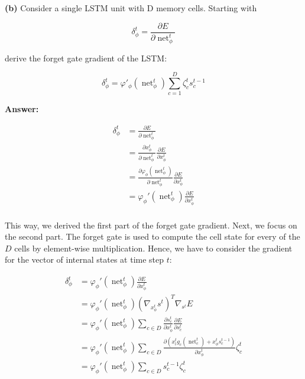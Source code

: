 \textbf{(b)} Consider a single LSTM unit with D memory cells. Starting with 

\begin{equation}
	\delta_\phi^t = \frac{\partial E}{\partial \operatorname{net}_\phi^t}
\end{equation}

derive the forget gate gradient of the LSTM:

\begin{equation}
	\delta_\phi^t = \varphi'_\phi(\operatorname{net}_\phi^t) \sum_{c=1}^{D} \zeta_c^t s_c^{t-1}
\end{equation}

\textbf{Answer:} 

\begin{align}
	\delta_\phi^t &= \frac{\partial E}{\partial \operatorname{net}_\phi^t} \\
	&= \frac{\partial x_\phi^t}{\partial \operatorname{net}_\phi^t} \frac{\partial E}{\partial x_\phi^t} \\
	&= \frac{\partial \varphi_\phi(\operatorname{net}_\phi^t)}{\partial \operatorname{net}_\phi^t} \frac{\partial E}{\partial x_\phi^t} \\
	&= \varphi_\phi'(\operatorname{net}_\phi^t) \frac{\partial E}{\partial x_\phi^t} \\
\end{align}

This way, we derived the first part of the forget gate gradient. Next, we focus on the second part. The forget gate is used to compute the cell state for every of the $D$ cells by element-wise multiplication. Hence, we have to consider the gradient for the vector of internal states at time step $t$:

\begin{align}
	\delta_\phi^t &= \varphi_\phi'(\operatorname{net}_\phi^t) \frac{\partial E}{\partial x_\phi^t} \\
	&=  \varphi_\phi'(\operatorname{net}_\phi^t) (\nabla_{x_{\phi}^t} s^t)^T \nabla_{s^t} E \\
	&=  \varphi_\phi'(\operatorname{net}_\phi^t) \sum_{c \in D} \frac{\partial s_c^t}{\partial x_{\phi}^t} \frac{\partial E}{\partial s_c^t} \\
	&=  \varphi_\phi'(\operatorname{net}_\phi^t) \sum_{c \in D} \frac{\partial \left(x_l^t g_c(\operatorname{net}_c^t) + x_\phi^t s_c^{t-1}\right)}{\partial x_{\phi}^t} \zeta_c^t \\
	&=  \varphi_\phi'(\operatorname{net}_\phi^t) \sum_{c \in D} s_c^{t-1} \zeta_c^t
\end{align}

